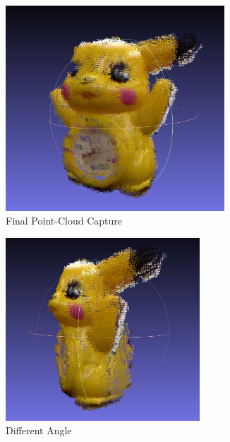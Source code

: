 \documentclass[11pt,oneside,english]{article}
\begin{document}
\begin{figure}[h]
  \centering
  \begin{subfigure}[b]{0.45\textwidth}
    \includegraphics[width=0.9\textwidth]{pika1}
    \caption{Final Point-Cloud Capture}
    \label{fig:awesome_image}
  \end{subfigure}
  \begin{subfigure}[b]{0.45\textwidth}
    \includegraphics[width=0.8\textwidth]{pika2}
    \caption{Different Angle}
    \label{fig:awesome_image}
  \end{subfigure}
  \begin{subfigure}[b]{0.45\textwidth}

\end{subfigure}
\end{figure}
\end{document}
